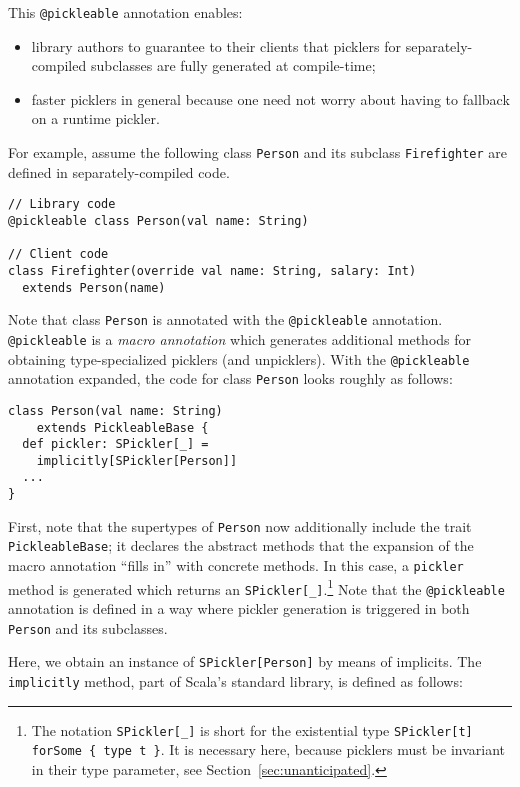 This \verb|@pickleable| annotation enables:

\begin{itemize}
\item library authors to guarantee to their clients that picklers for separately-compiled
subclasses are fully generated at compile-time;

\item faster picklers in general because one need not worry about having to
fallback on a runtime pickler.
\end{itemize}

For example, assume the following class \verb|Person| and its subclass
\verb|Firefighter| are defined in separately-compiled code.

\begin{lstlisting}
// Library code
@pickleable class Person(val name: String)

// Client code
class Firefighter(override val name: String, salary: Int)
  extends Person(name)
\end{lstlisting}

Note that class \verb|Person| is annotated with the \verb|@pickleable|
annotation. \verb|@pickleable| is a {\em macro annotation} which generates
additional methods for obtaining type-specialized picklers (and unpicklers).
With the \verb|@pickleable| annotation expanded, the code for class
\verb|Person| looks roughly as follows:

\begin{lstlisting}
class Person(val name: String)
    extends PickleableBase {
  def pickler: SPickler[_] =
    implicitly[SPickler[Person]]
  ...
}
\end{lstlisting}

First, note that the supertypes of \verb|Person| now additionally include the
trait \verb|PickleableBase|; it declares the abstract methods that the
expansion of the macro annotation ``fills in'' with concrete methods. In this
case, a \verb|pickler| method is generated which returns an
\verb|SPickler[_]|.\footnote{The notation \texttt{SPickler[\_]} is short for
the existential type \texttt{SPickler[t] forSome \{ type t \}}. It is necessary
here, because picklers must be invariant in their type parameter, see
Section~\ref{sec:unanticipated}.} Note that the \verb|@pickleable| annotation
is defined in a way where pickler generation is triggered in both
\verb|Person| and its subclasses.

Here, we obtain an instance of \verb|SPickler[Person]| by means of implicits.
The \verb|implicitly| method, part of Scala's standard library, is defined as
follows:

